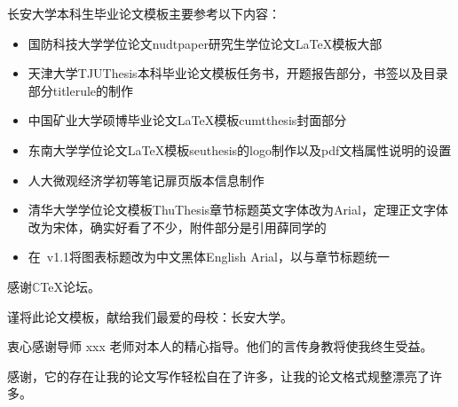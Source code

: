 
\begin{thanks}
长安大学本科生毕业论文\XeLaTeX{}模板主要参考以下内容：
\begin{itemize}
\item 国防科技大学学位论文nudtpaper研究生学位论文\LaTeX{}模板大部
\item 天津大学TJUThesis本科毕业论文模板任务书，开题报告部分，书签以及目录部分titlerule的制作
\item 中国矿业大学硕博毕业论文\LaTeX{}模板cumtthesis封面部分
\item 东南大学学位论文\LaTeX{}模板seuthesis的logo制作以及pdf文档属性说明的设置
\item 人大微观经济学初等笔记扉页版本信息制作
\item 清华大学学位论文模板ThuThesis章节标题英文字体改为{\sffamily Arial}，定理正文字体改为宋体，确实好看了不少，附件部分是引用薛同学的
\item 在\Chdpaper~v1.1将图表标题改为{\heiti 中文黑体}{\sffamily English Arial}，以与章节标题统一
\end{itemize}

感谢$\mathbb{C}$\TeX{}论坛。

\bigskip
谨将此论文模板，献给我们最爱的母校：长安大学。

衷心感谢导师 xxx 老师对本人的精心指导。他们的言传身教将使我终生受益。

感谢\Chdpaper{}，它的存在让我的论文写作轻松自在了许多，让我的论文格式规整漂亮了许多。

\end{thanks}
